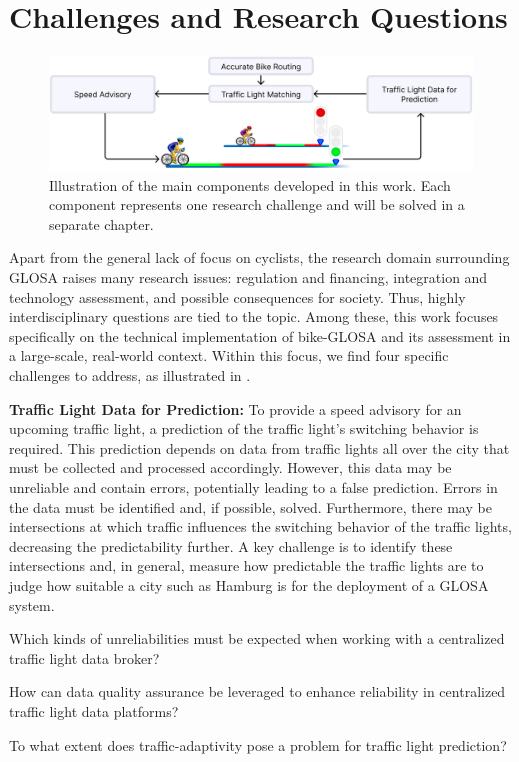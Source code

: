 \section{Challenges and Research Questions}

\begin{figure}[t]
\centering
\includegraphics[width=\linewidth]{images/outline.png}
\caption{Illustration of the main components developed in this work. Each component represents one research challenge and will be solved in a separate chapter.}
\label{fig:outline}
\end{figure}

Apart from the general lack of focus on cyclists, the research domain surrounding GLOSA raises many research issues: regulation and financing, integration and technology assessment, and possible consequences for society. Thus, highly interdisciplinary questions are tied to the topic. Among these, this work focuses specifically on the technical implementation of bike-GLOSA and its assessment in a large-scale, real-world context. Within this focus, we find four specific challenges to address, as illustrated in .

\textbf{\color{cidarkblue}Traffic Light Data for Prediction:} To provide a speed advisory for an upcoming traffic light, a prediction of the traffic light's switching behavior is required. This prediction depends on data from traffic lights all over the city that must be collected and processed accordingly. However, this data may be unreliable and contain errors, potentially leading to a false prediction. Errors in the data must be identified and, if possible, solved. Furthermore, there may be intersections at which traffic influences the switching behavior of the traffic lights, decreasing the predictability further. A key challenge is to identify these intersections and, in general, measure how predictable the traffic lights are to judge how suitable a city such as Hamburg is for the deployment of a GLOSA system.

\begin{researchquestion}
Which kinds of unreliabilities must be expected when working with a centralized traffic light data broker?
\end{researchquestion}
\begin{researchquestion}
How can data quality assurance be leveraged to enhance reliability in centralized traffic light data platforms?
\end{researchquestion}
\begin{researchquestion}
To what extent does traffic-adaptivity pose a problem for traffic light prediction?
\end{researchquestion}

